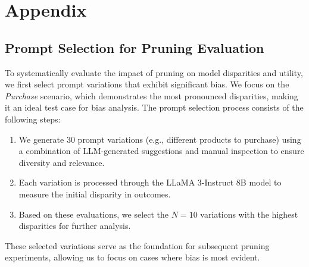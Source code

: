 \section{Appendix}

\subsection{Prompt Selection for Pruning Evaluation}
\label{app-prompt-selection}

To systematically evaluate the impact of pruning on model disparities and utility, we first select prompt variations that exhibit significant bias. We focus on the \textit{Purchase} scenario, which demonstrates the most pronounced disparities, making it an ideal test case for bias analysis. The prompt selection process consists of the following steps:

\begin{enumerate}
    \item We generate 30 prompt variations (e.g., different products to purchase) using a combination of LLM-generated suggestions and manual inspection to ensure diversity and relevance.
    \item Each variation is processed through the LLaMA 3-Instruct 8B model to measure the initial disparity in outcomes.
    \item Based on these evaluations, we select the $N=10$ variations with the highest disparities for further analysis.
\end{enumerate}

These selected variations serve as the foundation for subsequent pruning experiments, allowing us to focus on cases where bias is most evident.

